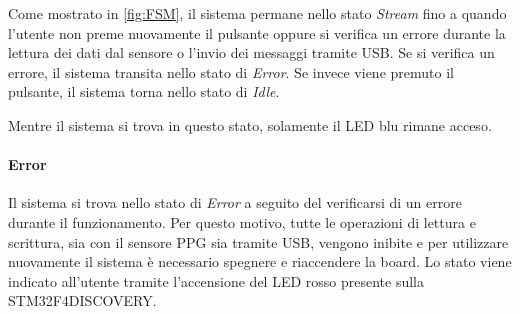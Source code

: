 Come mostrato in \Fig\ref{fig:FSM}, il sistema permane nello stato \textit{Stream} fino a quando l'utente non preme nuovamente il pulsante oppure si verifica un errore durante la lettura dei dati dal sensore o l'invio dei messaggi tramite USB. Se si verifica un errore, il sistema transita nello stato di \textit{Error}. Se invece viene premuto il pulsante, il sistema torna nello stato di \textit{Idle}.

Mentre il sistema si trova in questo stato, solamente il LED blu rimane acceso.

\paragraph{Error} Il sistema si trova nello stato di \textit{Error} a seguito del verificarsi di un errore durante il funzionamento. Per questo motivo, tutte le operazioni di lettura e scrittura, sia con il sensore PPG sia tramite USB, vengono inibite e per utilizzare nuovamente il sistema è necessario spegnere e riaccendere la board. Lo stato viene indicato all'utente tramite l'accensione del LED rosso presente sulla STM32F4DISCOVERY. 

\clearpage